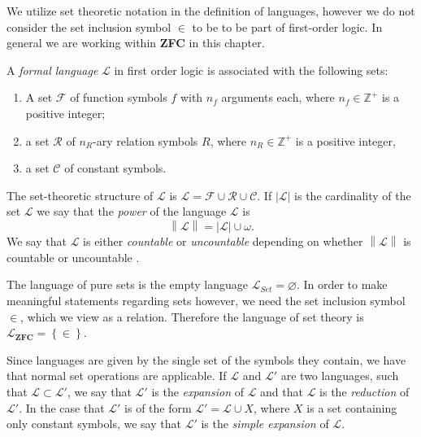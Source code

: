 \documentclass[../../main.tex]{subfiles}
\begin{document}
We utilize set theoretic notation in the definition of languages, however we do not consider the set inclusion symbol $\in$ to be to be part of first-order logic.
In general we are working within \textbf{ZFC} in this chapter.

\begin{definition}\cite[Definition 1.1.1]{Mar02}
    A \textit{formal language} $\mathcal{L}$ in first order logic is associated with the following sets:
    \begin{enumerate}
        \item A set $\mathcal{F}$ of function symbols $f$ with $n_f$ arguments each, 
        where $n_f \in \mathbb{Z}^+$ is a positive integer;
        \item a set $\mathcal{R}$ of $n_R$-ary relation symbols $R$, 
        where $n_R \in \mathbb{Z}^+$ is a positive integer,
        \item a set $\mathcal{C}$ of constant symbols.
    \end{enumerate}
    The set-theoretic structure of $\mathcal{L}$ is $\mathcal{L} = \mathcal{F} \cup \mathcal{R} \cup \mathcal{C}$.
    If $\left\lvert \mathcal{L}\right\rvert$ is the cardinality of the set $\mathcal{L}$ we say that the \textit{power} of the language $\mathcal{L}$ is
    $$\left\lVert \mathcal{L}\right\rVert = \left\lvert\mathcal{L}\right\rvert \cup \omega.$$
    We say that $\mathcal{L}$ is either \emph{countable} or \emph{uncountable} depending on whether $\left\lVert\mathcal{L}\right\rVert$ is countable or uncountable \cite[\S1.3]{Cha90}.
\end{definition}

The language of pure sets is the empty language $\mathcal{L}_{Set} = \varnothing$.
In order to make meaningful statements regarding sets however, we need the set inclusion symbol $\in$, which we view as a relation.
Therefore the language of set theory is $\mathcal{L}_{\textbf{ZFC}} = \left\{\in\right\}$. \cite[p.8]{Mar02}\cite[p.80]{Jec78}

Since languages are given by the single set of the symbols they contain, we have that normal set operations are applicable.
If $\mathcal{L}$ and $\mathcal{L}'$ are two languages, such that $\mathcal{L} \subset \mathcal{L}'$, 
we say that $\mathcal{L}'$ is the \textit{expansion} of $\mathcal{L}$ and that $\mathcal{L}$ is the \textit{reduction} of $\mathcal{L}'$.
In the case that $\mathcal{L}'$ is of the form $\mathcal{L}'= \mathcal{L} \cup X$, where $X$ is a set containing only constant symbols, 
we say that $\mathcal{L}'$ is the \textit{simple expansion} of $\mathcal{L}$. \cite[p.19]{Cha90}
\end{document}
